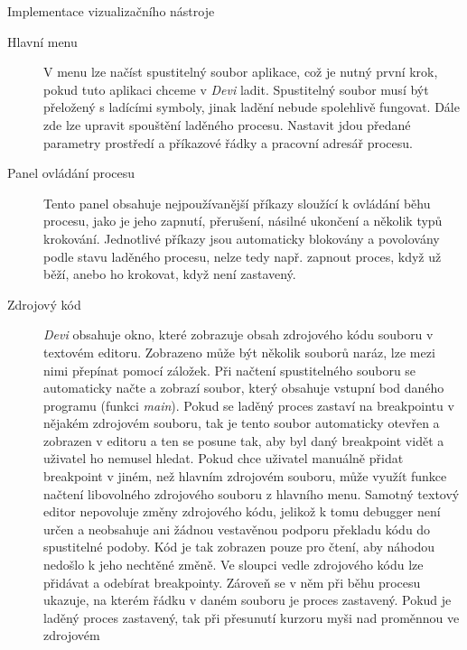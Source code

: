 \documentclass[czech,bachelor,male,python,dept460]{diploma}						%
\begin{document}
\begin{section}{Implementace vizualizačního nástroje}
	
	
	\begin{description}
		\item[Hlavní menu] V menu lze načíst spustitelný soubor aplikace, což je nutný první krok, pokud tuto aplikaci chceme v \textit{Devi} ladit.
			Spustitelný soubor musí být přeložený s ladícími symboly, jinak ladění nebude spolehlivě fungovat. Dále zde lze upravit spouštění laděného procesu.
			Nastavit jdou předané parametry prostředí a příkazové řádky a pracovní adresář procesu.
		\item[Panel ovládání procesu] Tento panel obsahuje nejpoužívanější příkazy sloužící k ovládání běhu procesu, jako je jeho zapnutí, přerušení, násilné
			ukončení a několik typů krokování. Jednotlivé příkazy jsou automaticky blokovány a povolovány podle stavu laděného procesu, nelze tedy např. zapnout
			proces, když už běží, anebo ho krokovat, když není zastavený.
		\item[Zdrojový kód] \textit{Devi} obsahuje okno, které zobrazuje obsah zdrojového kódu souboru v textovém editoru. Zobrazeno může být několik souborů naráz,
			lze mezi nimi přepínat pomocí záložek. Při načtení spustitelného souboru se automaticky načte a zobrazí soubor, který obsahuje vstupní bod daného programu
			(funkci \textit{main}). Pokud se laděný proces zastaví na breakpointu v nějakém zdrojovém souboru, tak je tento soubor automaticky otevřen a zobrazen
			v editoru a ten se posune tak, aby byl daný breakpoint vidět a uživatel ho nemusel hledat. Pokud chce uživatel manuálně přidat breakpoint v jiném, než
			hlavním zdrojovém souboru, může využít funkce načtení libovolného zdrojového souboru z hlavního menu. Samotný textový editor nepovoluje změny zdrojového
			kódu, jelikož k tomu debugger není určen a neobsahuje ani žádnou vestavěnou podporu překladu kódu do spustitelné podoby. Kód je tak zobrazen pouze pro
			čtení, aby náhodou nedošlo k jeho nechtěné změně. Ve sloupci vedle zdrojového kódu lze přidávat a odebírat breakpointy. Zároveň se v něm při běhu procesu
			ukazuje, na kterém řádku v daném souboru je proces zastavený. Pokud je laděný proces zastavený, tak při přesunutí kurzoru myši nad proměnnou ve zdrojovém

\end{description}
\end{section}
\end{document}
